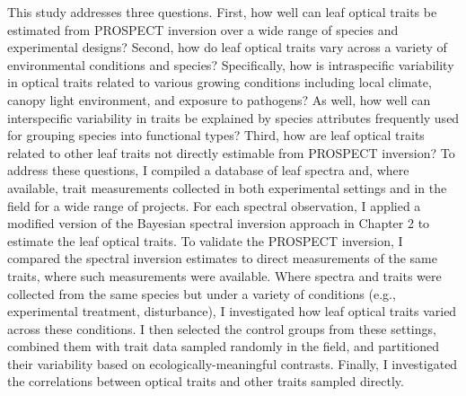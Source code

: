 This study addresses three questions.
First, how well can leaf optical traits be estimated from PROSPECT inversion over a wide range of species and experimental designs?
Second, how do leaf optical traits vary across a variety of environmental conditions and species?
Specifically, how is intraspecific variability in optical traits related to various growing conditions including local climate, canopy light environment, and exposure to pathogens?
As well, how well can interspecific variability in traits be explained by species attributes frequently used for grouping species into functional types? 
Third, how are leaf optical traits related to other leaf traits not directly estimable from PROSPECT inversion?
To address these questions, I compiled a database of leaf spectra and, where available, trait measurements collected in both experimental settings and in the field for a wide range of projects.
For each spectral observation, I applied a modified version of the Bayesian spectral inversion approach in Chapter 2 to estimate the leaf optical traits.
To validate the PROSPECT inversion, I compared the spectral inversion estimates to direct measurements of the same traits, where such measurements were available.
Where spectra and traits were collected from the same species but under a variety of conditions (e.g., experimental treatment, disturbance), I investigated how leaf optical traits varied across these conditions.
I then selected the control groups from these settings, combined them with trait data sampled randomly in the field, and partitioned their variability based on ecologically-meaningful contrasts.
Finally, I investigated the correlations between optical traits and other traits sampled directly.
